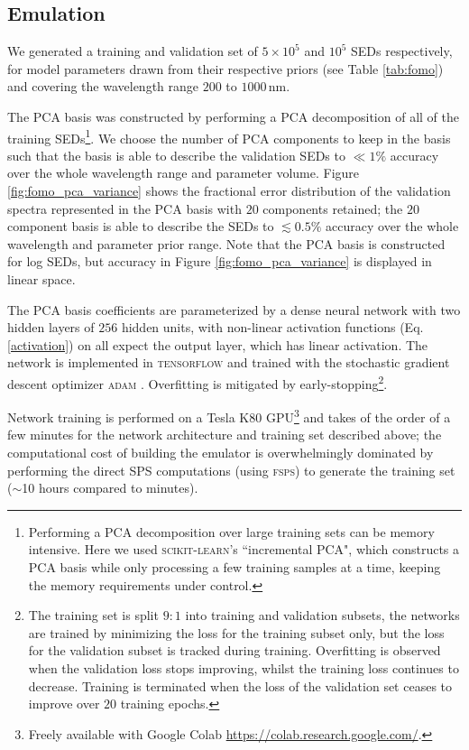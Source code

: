 \documentclass[twocolumn]{aastex62}
\begin{document}
\subsection{Emulation}
\label{sec:fomo_emulator}
We generated a training and validation set of $5\times 10^5$ and $10^5$ SEDs respectively, for model parameters drawn from their respective priors (see Table \ref{tab:fomo}) and covering the wavelength range $200$ to $1000\,\mathrm{nm}$.%

 The PCA basis was constructed by performing a PCA decomposition of all of the training SEDs\footnote{Performing a PCA decomposition over large training sets can be memory intensive. Here we used \textsc{scikit-learn}'s ``incremental PCA", which constructs a PCA basis while only processing a few training samples at a time, keeping the memory requirements under control.}. We choose the number of PCA components to keep in the basis such that the basis is able to describe the validation SEDs to $\ll 1\%$ accuracy over the whole wavelength range and parameter volume. Figure \ref{fig:fomo_pca_variance} shows the fractional error distribution of the validation spectra represented in the PCA basis with $20$ components retained; the $20$ component basis is able to describe the SEDs to $\lesssim 0.5\%$ accuracy over the whole wavelength and parameter prior range. Note that the PCA basis is constructed for log SEDs, but accuracy in Figure \ref{fig:fomo_pca_variance} is displayed in linear space.

The PCA basis coefficients are parameterized by a dense neural network with two hidden layers of $256$ hidden units, with non-linear activation functions (Eq. \eqref{activation}) on all expect the output layer, which has linear activation. The network is implemented in \textsc{tensorflow} \citep{tensorflow2015-whitepaper} and trained with the stochastic gradient descent optimizer \textsc{adam} \citep{kingma2014adam}. Overfitting is mitigated by early-stopping\footnote{The training set is split $9:1$ into training and validation subsets, the networks are trained by minimizing the loss for the training subset only, but the loss for the validation subset is tracked during training. Overfitting is observed when the validation loss stops improving, whilst the training loss continues to decrease. Training is terminated when the loss of the validation set ceases to improve over $20$ training epochs.}.

Network training is performed on a Tesla K80 GPU\footnote{Freely available with Google Colab \url{https://colab.research.google.com/}.} and takes of the order of a few minutes for the network architecture and training set described above; the computational cost of building the emulator is overwhelmingly dominated by performing the direct SPS computations (using \textsc{fsps}) to generate the training set ($\sim$10 hours compared to minutes).
%
\end{document}

